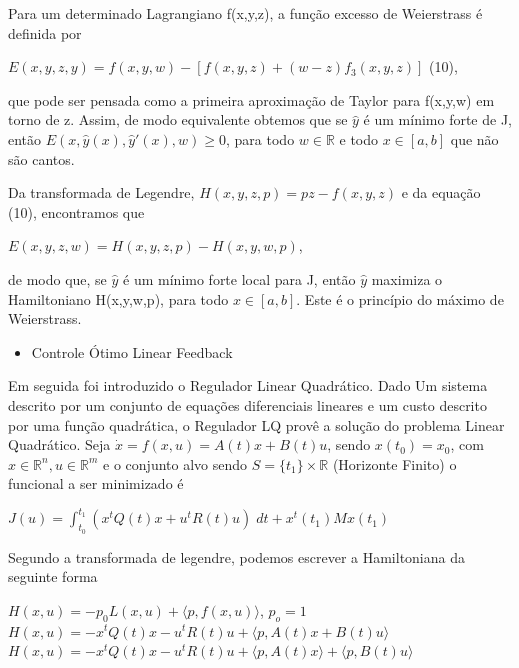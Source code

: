 \documentclass[12pt, a4paper]{article}
\begin{document}
Para um determinado Lagrangiano f(x,y,z), a função excesso de Weierstrass é definida por 

\begin{center}
$E(x,y,z,y) = f(x,y,w) - [f(x,y,z) + (w-z)f_3 (x,y,z)]$ (10),
\end{center}

que pode ser pensada como a primeira aproximação de Taylor para f(x,y,w) em torno de z. Assim, de modo equivalente obtemos que se $\hat{y}$ é um mínimo forte de J, então $E(x,\hat{y}(x),\hat{y}'(x), w) \ge 0$,   para todo $w \in \mathbb{R}$ e todo $x \in [a,b]$ que não são cantos.

Da transformada de Legendre, $H(x,y,z,p)=pz-f(x,y,z)$ e da equação (10), encontramos que 

\begin{center}
$E(x,y,z,w)=H(x,y,z,p)-H(x,y,w,p)$,
\end{center}

de modo que, se $\hat{y}$ é um mínimo forte local para J, então $\hat{y}$ maximiza o Hamiltoniano H(x,y,w,p), para todo $x \in [a,b]$. Este é o princípio do máximo de Weierstrass.

\begin{itemize}
\item Controle Ótimo Linear Feedback
\end{itemize}

Em seguida foi introduzido o Regulador Linear Quadrático. Dado Um sistema descrito por um conjunto de equações diferenciais lineares e um custo descrito por uma função quadrática, o Regulador LQ provê a solução do problema Linear Quadrático.
Seja $\dot{x} = f(x,u) = A(t)x + B(t)u$, sendo $x(t_0) = x_0$, com $x \in \mathbb{R}^n, u \in \mathbb{R}^m$  e o conjunto alvo sendo $S= \lbrace t_1\rbrace \times \mathbb{R}$ (Horizonte Finito) o funcional a ser minimizado é

\begin{center}
$ J(u) = \int_{t_0}^{t_1} (x^tQ(t)x + u^tR(t)u) \; dt + x^t(t_1)Mx(t_1) $
\end{center} 

Segundo a transformada de legendre, podemos escrever a Hamiltoniana  da seguinte forma

\begin{center}

$H(x,u) = -p_0L(x,u) + \langle p, f(x,u) \rangle$, $p_o = 1$ \\
$H(x,u) = -x^tQ(t)x - u^tR(t)u + \langle p, A(t)x + B(t)u \rangle$\\
$H(x,u) = -x^tQ(t)x - u^tR(t)u + \langle p, A(t)x \rangle + \langle p, B(t)u \rangle$\\\
\end{center}
\end{document}
